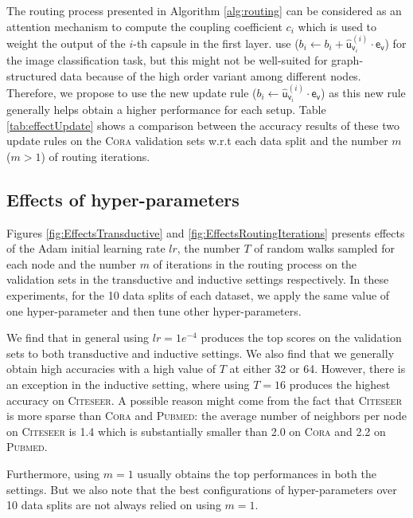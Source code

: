 \documentclass[sigconf]{acmart}
\begin{document}
The routing process presented in Algorithm \ref{alg:routing} can be considered as an attention mechanism to compute the coupling coefficient $c_{i}$ which is used to weight the output of the $i$-th  capsule in the first layer.
\citet{sabour2017dynamic} use ($b_{i} \leftarrow b_{i} + \hat{\boldsymbol{\mathsf{u}}}_{\mathsf{v}_i}^{(i)}\cdot\boldsymbol{\mathsf{e}}_{\mathsf{v}}$) for the image classification task, but this might not be well-suited for graph-structured data because of the high order variant among different nodes. 
Therefore, we propose to use the new update rule ($b_{i} \leftarrow \hat{\boldsymbol{\mathsf{u}}}_{\mathsf{v}_i}^{(i)}\cdot\boldsymbol{\mathsf{e}}_{\mathsf{v}}$) as this new rule generally helps obtain a higher performance for each setup.
Table \ref{tab:effectUpdate} shows a comparison between the accuracy results of these two update rules on the \textsc{Cora} validation sets w.r.t each data split and the number $m$ ($m > 1$) of routing iterations.



\subsection{Effects of hyper-parameters}

Figures \ref{fig:EffectsTransductive}  and \ref{fig:EffectsRoutingIterations} presents effects of the Adam initial learning rate $lr$, the number $T$ of random walks sampled for each node and the number $m$ of iterations in the routing process on the validation sets in the transductive and inductive settings respectively. In these experiments, for the 10 data splits of each dataset, we apply the same value of one hyper-parameter and then tune other hyper-parameters.

We find that in general  using  $lr=1e^{-4}$ produces the top scores on the validation sets to both transductive and inductive settings. We also find that we generally obtain high accuracies with a high value of $T$ at either 32 or 64. However, there is an exception in the inductive setting,  where using $T=16$ produces the highest accuracy  on \textsc{Citeseer}. A possible reason might come from the fact that \textsc{Citeseer} is more sparse than \textsc{Cora} and \textsc{Pubmed}: the average number of neighbors per node on \textsc{Citeseer} is 1.4 which is substantially smaller than 2.0 on \textsc{Cora}  and 2.2 on  \textsc{Pubmed}. 


Furthermore, using $m=1$ usually obtains the top performances in both the settings.
But we also note that the best configurations of hyper-parameters over 10 data splits are not always relied on using $m=1$.
\end{document}
